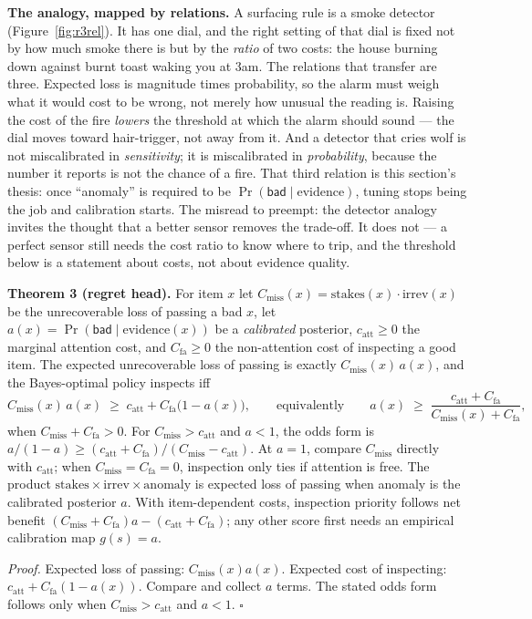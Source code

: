 \documentclass[11pt,a4paper]{article}
\begin{document}
\textbf{The analogy, mapped by relations.} A surfacing rule is a smoke detector (Figure~\ref{fig:r3rel}). It has one dial, and the right setting of that dial is fixed not by how much smoke there is but by the \emph{ratio} of two costs: the house burning down against burnt toast waking you at 3am. The relations that transfer are three. Expected loss is magnitude times probability, so the alarm must weigh what it would cost to be wrong, not merely how unusual the reading is. Raising the cost of the fire \emph{lowers} the threshold at which the alarm should sound --- the dial moves toward hair-trigger, not away from it. And a detector that cries wolf is not miscalibrated in \emph{sensitivity}; it is miscalibrated in \emph{probability}, because the number it reports is not the chance of a fire. That third relation is this section's thesis: once ``anomaly'' is required to be $\Pr(\mathsf{bad}\mid\text{evidence})$, tuning stops being the job and calibration starts. The misread to preempt: the detector analogy invites the thought that a better sensor removes the trade-off. It does not --- a perfect sensor still needs the cost ratio to know where to trip, and the threshold below is a statement about costs, not about evidence quality.



\begin{thebox}
\textbf{Theorem 3 (regret head).} For item $x$ let $C_{\mathrm{miss}}(x)=\mathrm{stakes}(x)\cdot\mathrm{irrev}(x)$ be the unrecoverable loss of passing a bad $x$, let $a(x)=\Pr(\mathsf{bad}\mid\text{evidence}(x))$ be a \emph{calibrated} posterior, $c_{\mathrm{att}}\ge0$ the marginal attention cost, and $C_{\mathrm{fa}}\ge0$ the non-attention cost of inspecting a good item. The expected unrecoverable loss of passing is exactly $C_{\mathrm{miss}}(x)\,a(x)$, and the Bayes-optimal policy inspects iff
\[
C_{\mathrm{miss}}(x)\,a(x)\;\ge\;c_{\mathrm{att}}+C_{\mathrm{fa}}\bigl(1-a(x)\bigr),
\qquad\text{equivalently}\qquad
a(x)\;\ge\;\frac{c_{\mathrm{att}}+C_{\mathrm{fa}}}{C_{\mathrm{miss}}(x)+C_{\mathrm{fa}}},
\]
when $C_{\mathrm{miss}}+C_{\mathrm{fa}}>0$. For $C_{\mathrm{miss}}>c_{\mathrm{att}}$ and $a<1$, the odds form is $a/(1-a)\ge(c_{\mathrm{att}}+C_{\mathrm{fa}})/(C_{\mathrm{miss}}-c_{\mathrm{att}})$. At $a=1$, compare $C_{\mathrm{miss}}$ directly with $c_{\mathrm{att}}$; when $C_{\mathrm{miss}}=C_{\mathrm{fa}}=0$, inspection only ties if attention is free. The product $\mathrm{stakes}\times\mathrm{irrev}\times\mathrm{anomaly}$ is expected loss of passing when anomaly is the calibrated posterior $a$. With item-dependent costs, inspection priority follows net benefit $(C_{\mathrm{miss}}+C_{\mathrm{fa}})a-(c_{\mathrm{att}}+C_{\mathrm{fa}})$; any other score first needs an empirical calibration map $g(s)=a$.

\emph{Proof.} Expected loss of passing: $C_{\mathrm{miss}}(x)a(x)$. Expected cost of inspecting: $c_{\mathrm{att}}+C_{\mathrm{fa}}(1-a(x))$. Compare and collect $a$ terms. The stated odds form follows only when $C_{\mathrm{miss}}>c_{\mathrm{att}}$ and $a<1$. $\square$
\end{thebox}
\end{document}
